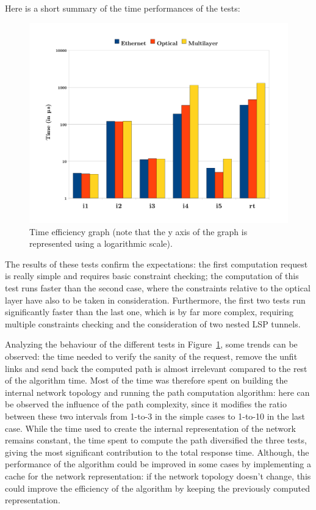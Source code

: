 \documentclass[10pt,a4paper]{report}
\begin{document}
Here is a short summary of the time performances of the tests:
\begin{figure}[!htbp]
  \begin{center}
    \includegraphics[width=1\textwidth]{img/time_graph}
    \caption[Algorithm time efficiency graph]{Time efficiency graph
      (note that the y axis of the graph is represented using a
      logarithmic scale).}
    \label{fig:time_graph}
  \end{center}
\end{figure}

The results of these tests confirm the expectations: the first
computation request is really simple and requires basic constraint
checking; the computation of this test runs faster than the second
case, where the constraints relative to the optical layer have also to
be taken in consideration. Furthermore, the first two tests run
significantly faster than the last one, which is by far more complex,
requiring multiple constraints checking and the consideration of two
nested LSP tunnels.

Analyzing the behaviour of the different tests in
Figure~\ref{fig:time_graph}, some trends can be observed: the time
needed to verify the sanity of the request, remove the unfit links and
send back the computed path is almost irrelevant compared to the rest
of the algorithm time. Most of the time was therefore spent on
building the internal network topology and running the path
computation algorithm: here can be observed the influence of the path
complexity, since it modifies the ratio between these two intervals
from 1-to-3 in the simple cases to 1-to-10 in the last case. While the
time used to create the internal representation of the network remains
constant, the time spent to compute the path diversified the three
tests, giving the most significant contribution to the total response
time. Although, the performance of the algorithm could be improved in
some cases by implementing a cache for the network representation: if
the network topology doesn't change, this could improve the efficiency
of the algorithm by keeping the previously computed representation.
\end{document}
